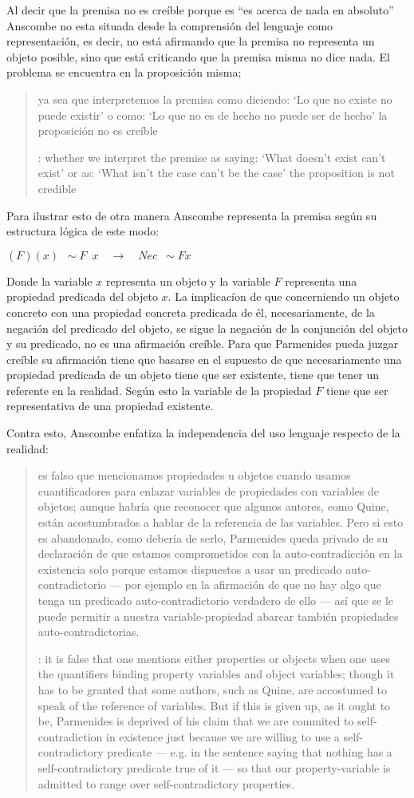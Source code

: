 Al decir que la premisa no es creíble porque es \enquote{es acerca de nada en absoluto} Anscombe no esta situada desde la comprensión del lenguaje como representación, es decir, no está afirmando que la premisa no representa un objeto posible, sino que está criticando que la premisa misma no dice nada. El problema se encuentra en la proposición misma; \blockquote[{\cite[5]{anscombe1981parmenides:pmc}}: whether we interpret the premise as saying: `What doesn't exist can't exist' or as: `What isn't the case can't be the case' the proposition is not credible]{ya sea que interpretemos la premisa como diciendo: `Lo que no existe no puede existir' o como: `Lo que no es de hecho no puede ser de hecho' la proposición no es creíble}. Para ilustrar esto de otra manera Anscombe representa la premisa según su estructura lógica de este modo:
  \begin{center}$(F)(x)\enspace {\sim}F\enspace x\quad \longrightarrow\quad Nec\enspace {\sim}Fx$\end{center}
Donde la variable $x$ representa un objeto y la variable $F$ representa una propiedad predicada del objeto $x$. La implicacíon de que concerniendo un objeto concreto con una propiedad concreta predicada de él, necesariamente, de la negación del predicado del objeto, se sigue la negación de la conjunción del objeto y su predicado, no es una afirmación creíble. Para que Parmenides pueda juzgar creíble su afirmación tiene que basarse en el supuesto de que necesariamente una propiedad predicada de un objeto tiene que ser existente, tiene que tener un referente en la realidad. Según esto la variable de la propiedad $F$ tiene que ser representativa de una propiedad existente.

Contra esto, Anscombe enfatiza la independencia del uso lenguaje respecto de la realidad: \blockquote[{\cite[5]{anscombe1981parmenides:pmc}}: it is false that one mentions either properties or objects when one uses the quantifiers binding property variables and object variables; though it has to be granted that some authors, such as Quine, are accostumed to speak of the reference of variables. But if this is given up, as it ought to be, Parmenides is deprived of his claim that we are commited to self-contradiction in existence just because we are willing to use a self-contradictory predicate --- e.g. in the sentence saying that nothing has a self-contradictory predicate true of it --- so that our property-variable is admitted to range over self-contradictory properties.]{es falso que mencionamos propiedades u objetos cuando usamos cuantificadores para enlazar variables de propiedades con variables de objetos; aunque habría que reconocer que algunos autores, como Quine, están acostumbrados a hablar de la referencia de las variables. Pero si esto es abandonado, como debería de serlo, Parmenides queda privado de su declaración de que estamos comprometidos con la auto-contradicción en la existencia solo porque estamos dispuestos a usar un predicado auto-contradictorio --- por ejemplo en la afirmación de que no hay algo que tenga un predicado auto-contradictorio verdadero de ello --- así que se le puede permitir a nuestra variable-propiedad abarcar también propiedades auto-contradictorias.}

